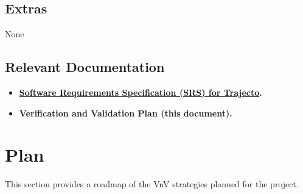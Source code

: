 \documentclass[12pt, titlepage]{article}
\providecommand{\wss}[1]{}
\begin{document}
\wss{You should also list the objectives that are out of scope.  You don't have 
the resources to do everything, so what will you be leaving out.  For instance, 
if you are not going to verify the quality of usability, state this.  It is also 
worthwhile to justify why the objectives are left out.}


\subsection{Extras}

None 

\subsection{Relevant Documentation}

\begin{itemize}
  \item \textbf{\href{https://joezzg.github.io/CAS741/SRS/SRS.pdf}{Software Requirements Specification (SRS) for Trajecto}.}

  \item \textbf{Verification and Validation Plan (this document).}

\end{itemize}


\section{Plan}\label{Sec:VnVPlan}

This section provides a roadmap of the VnV strategies planned for the project.
\end{document}
